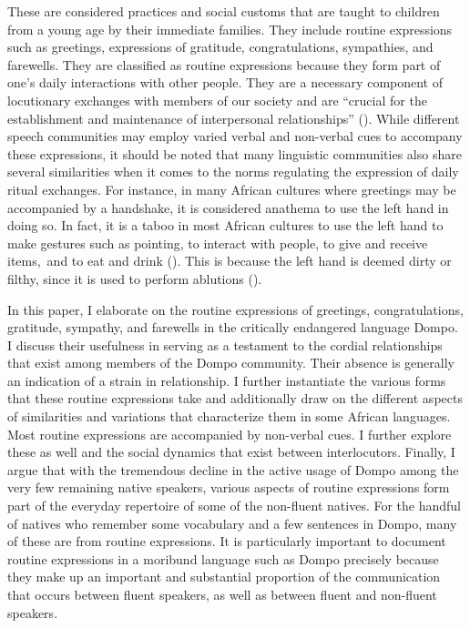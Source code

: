 \documentclass[output=paper,colorlinks,citecolor=brown]{langscibook}
\begin{document}
These are considered practices and social customs that are taught to children from a young age by their immediate families. They include routine expressions such as greetings, expressions of gratitude, congratulations, sympathies, and farewells. They are classified as routine expressions because they form part of one's daily interactions with other people. They are a necessary component of locutionary exchanges with members of our society and are “crucial for the establishment and maintenance of interpersonal relationships” (\cite[171]{Wójtowicz2021}). While different speech communities may employ varied verbal and non-verbal cues to accompany these expressions, it should be noted that many linguistic communities also share several similarities when it comes to the norms regulating the expression of daily ritual exchanges. For instance, in many African cultures where greetings may be accompanied by a handshake, it is  considered anathema to use the left hand in doing so. In fact, it is a taboo in most African cultures to use the left hand to make gestures such as pointing, to interact with people, to give and receive items,\ and to eat and drink (\citealt{Alhassan2018, AmekaandBreeveld2004, KitaEssegbey2001, Wójtowicz2021}). This is because the left hand is deemed dirty or filthy, since it is used to perform ablutions (\cite[170]{AmekaandBreeveld2004}). 

In this paper, I elaborate on the routine expressions of greetings, congratulations, gratitude, sympathy, and farewells in the critically endangered language Dompo. I discuss their usefulness in serving as a testament to the cordial relationships that exist among members of the Dompo community. Their absence is generally an indication of a strain in relationship. I further instantiate the various forms that these routine expressions take and additionally draw on the different aspects of similarities and variations that characterize them in some African languages. Most routine expressions are accompanied by non-verbal cues. I further explore these as well and the social dynamics that exist between interlocutors. Finally, I argue that with the tremendous decline in the active usage of Dompo among the very few remaining native speakers, various aspects of routine expressions form part of the everyday repertoire of some of the non-fluent natives. For the handful of natives who remember some vocabulary and a few sentences in Dompo, many of these are from routine expressions. It is particularly important to document routine expressions in a moribund language such as Dompo precisely because they make up an important and substantial proportion of the communication that occurs between fluent speakers, as well as between fluent and non-fluent speakers.
\end{document}
